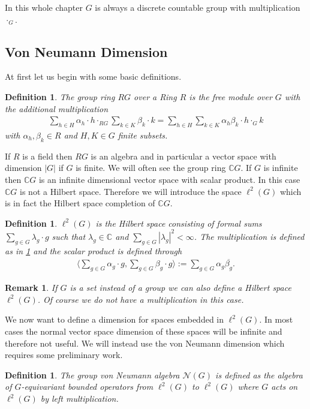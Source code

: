 \documentclass[12pt,a4paper]{scrartcl}
\newtheorem{Definition}[Theorem]{Definition}
\newtheorem{Remark}[Theorem]{Remark}
\numberwithin{equation}{section}
\newcommand{\C}{\mathbb{C}} %
\newcommand{\2}{\mathbb{Z} / 2 \mathbb{Z}}
\newcommand{\1}{\bar{1}}
\newcommand{\0}{\bar{0}}
\begin{document}
In this whole chapter $G$ is always a discrete countable group with multiplication $\cdot_G$.
\subsection{Von Neumann Dimension} \label{fiss}
At first let us begin with some basic definitions.
\begin{Definition} \label{GR}
	The \emph{group ring} $RG$ over a Ring $R$ is the free module over $G$ with the additional multiplication
	\begin{align*}
		\sum_{h \in H} \alpha_h \cdot h \cdot_{RG} \sum_{k \in K} \beta_k \cdot k = \sum_{h \in H} \sum_{k \in K} \alpha_h \beta_k \cdot h \cdot_G k
	\end{align*}
	with $\alpha_h, \beta_k \in R$ and $H, K \in G$ finite subsets.
\end{Definition}
If $R$ is a field then $RG$ is an algebra and in particular a vector space with dimension $|G|$ if $G$ is finite. We will often see the group ring $\C G$. If $G$ is infinite then $\C G$ is an infinite dimensional vector space with scalar product. In this case $\C G$ is not a Hilbert space. Therefore we will introduce the space $\ell^2(G)$ which is in fact the Hilbert space completion of $\C G$.
\begin{Definition}
	$\ell^2(G)$ is the Hilbert space consisting of formal sums $\sum_{g \in G} \lambda_g \cdot g$ such that $\lambda_g \in \C$ and $\sum_{g \in G} |\lambda_g|^2 < \infty$. The multiplication is defined as in \ref{GR} and the scalar product is defined through
	\begin{align*}
		\langle \sum_{g \in G} \alpha_g \cdot g, \sum_{g \in G} \beta_g \cdot g \rangle := \sum_{g \in G} \alpha_g \overline{\beta_g}.
	\end{align*}
\end{Definition}
\begin{Remark}
	If $G$ is a set instead of a group we can also define a Hilbert space $\ell^2(G)$. Of course we do not have a multiplication in this case.
\end{Remark}
We now want to define a dimension for spaces embedded in $\ell^2(G)$. In most cases the normal vector space dimension of these spaces will be infinite and therefore not useful. We will instead use the von Neumann dimension which requires some preliminary work.
\begin{Definition}
	The \emph{group von Neumann} algebra $\mathcal{N}(G)$ is defined as the algebra of $G$-equivariant bounded operators from $\ell^2(G)$ to $\ell^2(G)$ where $G$ acts on $\ell^2(G)$ by left multiplication.
\end{Definition}
\end{document}
